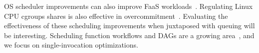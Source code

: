 OS scheduler improvements can also improve FaaS workloads~\cite{fu2022sfs}. 
Regulating Linux CPU cgroups shares is also effective in overcommitment~\cite{ensure-faas-acsos20}.
Evaluating the effectiveness of these scheduling improvements when juxtaposed with queuing will be interesting. 
Scheduling function workflows and DAGs are a growing area~\cite{shen_defuse_2021,mahgoub_wisefuse_2022,zhou_qos-aware_2022}, and we focus on single-invocation optimizations. 

\begin{comment}
Restoring from snapshots~\cite{vhive, faasnap, catalyzer}


\paragraph{Edge.}
The lower resource availability of edge platforms also motivates lighter control planes. 
Tinyfaas is a apecialized FaaS platform for the edge 
\cite{pfandzelter_tinyfaas_2020}, but uses existing control planes like OpenWhisk and Kubless.
\cite{hall_execution_2019}


\paragraph{Scheduling.}

ANY papers that use previous running time/task size information!? Atoll. Aquatope. 

Tail latency: 50ms for warm-starts for the cloud.~\cite{ustiugov_analyzing_2021} 

RL scheduling~\cite{yu2021faasrank}. 

Lets trace it\cite{scheuner_lets_2022} , platform overheads etc.


Workflow and serverless DAG scheduling is complementary to \sysname. 

FnSched. Anshul~\cite{}. Centralized Scheduling? 

Sharing containers in SAND~\cite{akkus_sand_2018}

Hierarchical scheduling (within container) in HyperFaas. 

\paragraph{OpenWhisk.}
\cite{quevedo_evaluating_2019} evaluates the cold and warm times under OpenWhisk. 
OW Hash based scheduling described in~\cite{kim_scheduling_2021}.


\end{comment}
